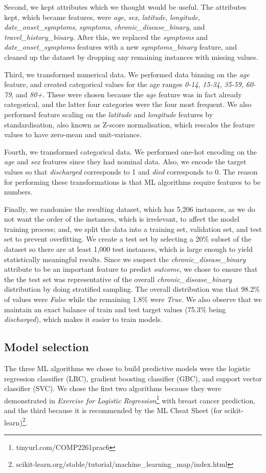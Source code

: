 \documentclass[twoside,11pt]{article}
\begin{document}
Second, we kept attributes which we thought would be useful. The attributes kept, which became features, were \emph{age}, \emph{sex}, \emph{latitude}, \emph{longitude}, \emph{date\_onset\_symptoms}, \emph{symptoms}, \emph{chronic\_disease\_binary}, and \emph{travel\_history\_binary}. After this, we replaced the \emph{symptoms} and \emph{date\_onset\_symptoms} features with a new \emph{symptoms\_binary} feature, and cleaned up the dataset by dropping any remaining instances with missing values. 

Third, we transformed numerical data. We performed data binning on the \emph{age} feature, and created categorical values for the age ranges \emph{0-14}, \emph{15-34}, \emph{35-59}, \emph{60-79}, and \emph{80+}. These were chosen because the \emph{age} feature was in fact already categorical, and the latter four categories were the four most frequent. We also performed feature scaling on the \emph{latitude} and \emph{longitude} features by standardisation, also known as Z-score normalisation, which rescales the feature values to have zero-mean and unit-variance.  

Fourth, we transformed categorical data. We performed one-hot encoding on the \emph{age} and \emph{sex} features since they had nominal data. Also, we encode the target values so that \emph{discharged} corresponds to 1 and \emph{died} corresponds to 0. The reason for performing these transformations is that ML algorithms require features to be numbers. 

Finally, we randomise the resulting dataset, which has 5,206 instances, as we do not want the order of the instances, which is irrelevant, to affect the model training process; and, we split the data into a training set, validation set, and test set to prevent overfitting. We create a test set by selecting a 20\% subset of the dataset so there are at least 1,000 test instances, which is large enough to yield statistically meaningful results. Since we suspect the \emph{chronic\_disease\_binary} attribute to be an important feature to predict \emph{outcome}, we chose to ensure that the the test set was representative of the overall \emph{chronic\_disease\_binary} distribution by doing stratified sampling. The overall distribution was that 98.2\% of values were \emph{False} while the remaining 1.8\% were \emph{True}. We also observe that we maintain an exact balance of train and test target values (75.3\% being \emph{discharged}), which makes it easier to train models.

\subsection{Model selection}
The three ML algorithms we chose to build predictive models were the logistic regression classifier (LRC), gradient boosting classifier (GBC), and support vector classifier (SVC). We chose the first two algorithms because they were demonstrated in \emph{Exercise for Logistic Regression}\footnote{tinyurl.com/COMP2261prac6} with breast cancer prediction, and the third because it is recommended by the ML Cheat Sheet (for scikit-learn)\footnote{scikit-learn.org/stable/tutorial/machine\_learning\_map/index.html}.
\end{document}
